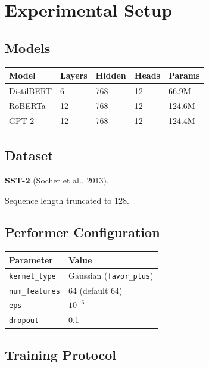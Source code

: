 
\section{Experimental Setup}

\subsection{Models}

\begin{table}[H]
\centering
\small
\begin{tabular}{lllll}
\toprule
\textbf{Model} & \textbf{Layers} & \textbf{Hidden} & \textbf{Heads} & \textbf{Params} \\
\midrule
DistilBERT & 6 & 768 & 12 & 66.9M \\
RoBERTa & 12 & 768 & 12 & 124.6M \\
GPT-2 & 12 & 768 & 12 & 124.4M \\
\bottomrule
\end{tabular}
\end{table}

\subsection{Dataset}

\textbf{SST-2} (Socher et al., 2013).

Sequence length truncated to 128.

\subsection{Performer Configuration}

\begin{table}[H]
\centering
\small
\begin{tabular}{ll}
\toprule
\textbf{Parameter} & \textbf{Value} \\
\midrule
\texttt{kernel\_type} & Gaussian (\texttt{favor\_plus}) \\
\texttt{num\_features} & 64 (default 64) \\
\texttt{eps} & $10^{-6}$ \\
\texttt{dropout} & 0.1 \\
\bottomrule
\end{tabular}
\end{table}

\subsection{Training Protocol}

